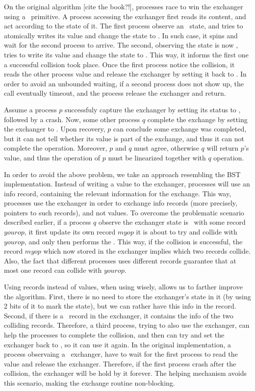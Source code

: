 On the original algorithm [cite the book?!], processes race to win the exchanger using a \CAS\ primitive. A process accessing the exchanger first reads its content, and act according to the state of it. The first process observe an \emptyst\ state, and tries to atomically writes its value and change the state to \waiting. In such case, it spins and wait for the second process to arrive. The second, observing the state is now \waiting, tries to write its value and change the state to \busy. This way, it informs the first one a successful collision took place. Once the first process notice the collision, it reads the other process value and release the exchanger by setting it back to \emptyst.
In order to avoid an unbounded waiting, if a second process does not show up, the call eventually timeout, and the process release the exchanger and return.

Assume a process $p$ successfuly capture the exchanger by setting its status to \waiting, followed by a crash. Now, some other process $q$ complete the exchange by setting the exchanger to \busy. Upon recovery, $p$ can conclude some exchange was completed, but it can not tell whether its value is part of the exchange, and thus it can not complete the operation. Moreover, $p$ and $q$ must agree, otherwise $q$ will return $p$'s value, and thus the operation of $p$ must be linearized together with $q$ operation.

In order to avoid the above problem, we take an approach resembling the BST implementation. Instead of writing a value to the exchanger, processes will use an info record, containing the relevant information for the exchange. This way, processes use the exchanger in order to exchange info records (more precisely, pointers to such records), and not values. To overcome the problematic scenario described earlier, if a process $q$ observe the exchanger state is \waiting\ with some record $yourop$, it first update its own record $myop$ it is about to try and collide with $yourop$, and only then performs the \CAS. This way, if the collision is successful, the record $myop$ which now stored in the exchanger implies which two records collide. Also, the fact that different processes uses different records guarantee that at most one record can collide with $yourop$.

Using records instead of values, when using wisely, allows us to farther improve the algorithm. First, there is no need to store the exchanger's state in it (by using 2 bits of it to mark the state), but we can rather have this info in the record. Second, if there is a \busy\ record in the exchanger, it contains the info of the two colliding records. Therefore, a third process, trying to also use the exchanger, can help the processes to complete the collision, and then can try and set the exchanger back to \emptyst, so it can use it again. In the original implementation, a process observaing a \busy\ exchanger, have to wait for the first process to read the value and release the exchanger. Therefore, if the first process crash after the collision, the exchanger will be hold by it forever. The helping mechanism avoids this scenario, making the exchange routine non-blocking.

